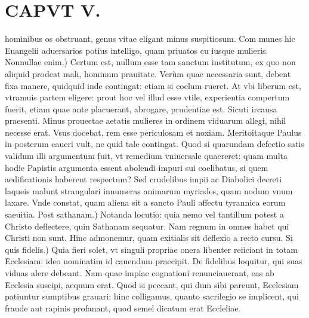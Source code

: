 \documentclass{article}
\begin{document}
\begin{pages}
\subsection*{\textit{}}
\section*{CAPVT V. }
\marginpar{[ p.65 ]}\pstart hominibus os obstruant, genus vitae eligant minus suspitiosum. Com munes hic Euangelii aduersarios potius intelligo, quam priuatos cu iusque mulieris.  \pend\pstart Nonnullae enim.) Certum est, nullum esse tam sanctum institutum, ex quo non aliquid prodeat mali, hominum prauitate. Verùm quae necessaria sunt, debent fixa manere, quidquid inde contingat: etiam si coelum rueret. At vbi liberum est, vtramuis partem eligere: prout hoc vel illud esse vtile, experientia compertum fuerit, etiam quae ante placuerant, abrogare, prudentiae est. Sicuti ircausa praesenti. Minus prouectae aetatis mulieres in ordinem viduarum allegi, nihil necesse erat. Vsus docebat, rem esse periculosam et noxiam. Meritoitaque Paulus in posterum caueri vult, ne quid tale contingat. Quod si quarundam defectio satis validum illi argumentum fuit, vt remedium vniuersale quaereret: quam multa hodie Papistis argumenta essent abolendi impuri sui coelibatus, si quem aedificationis haberent respectum? Sed crudelibus impii ac Diabolici decreti laqueis malunt strangulari innumeras animarum myriades, quam nodum vnum laxare. Vnde constat, quam aliena sit a sancto Pauli affectu tyrannica eorum saeuitia.  \pend\pstart Post sathanam.) Notanda locutio: quia nemo vel tantillum potest a Christo deflectere, quin Sathanam sequatur. Nam regnum in omnes habet qui Christi non sunt. Hinc admonemur, quam exitialis sit deflexio a recto cursu.  \pend\pstart Si quis fidelis.) Quia fieri solet, vt singuli propriae onera libenter reiiciant in totam Ecclesiam: ideo nominatim id cauendum praecipit. De fidelibus loquitur, qui suas viduas alere debeant. Nam quae impiae cognationi renunciauerant, eas ab Ecclesia suscipi, aequum erat. Quod si peccant, qui dum sibi pareunt, Ecelesiam patiuntur sumptibus grauari: hinc colligamus, quanto sacrilegio se implicent, qui fraude aut rapinis profanant, quod semel dicatum erat Eccleliae.  \pend
{}
{}

\end{pages}
\end{document}
